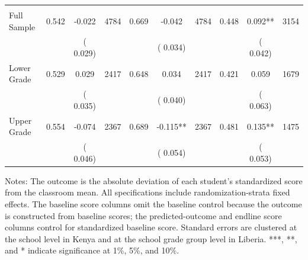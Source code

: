 \begin{table}[H]
\begin{threeparttable}
\begin{tabular}[t]{lccccccccc}
\addlinespace
\multicolumn{10}{l}{\textbf{\textit{Panel B: Liberia}}} \\
Full Sample &  0.542 &  -0.022 & 4784 &  0.669 &  -0.042 & 4784 &  0.448 &   0.092** & 3154 \\
 &  & (  0.029) &  &  & (  0.034) &  &  & (  0.042) & \\
Lower Grade &  0.529 &   0.029 & 2417 &  0.648 &   0.034 & 2417 &  0.421 &   0.059 & 1679 \\
 &  & (  0.035) &  &  & (  0.040) &  &  & (  0.063) & \\
Upper Grade &  0.554 &  -0.074 & 2367 &  0.689 &  -0.115** & 2367 &  0.481 &   0.135** & 1475 \\
 &  & (  0.046) &  &  & (  0.054) &  &  & (  0.053) & \\
\bottomrule
\end{tabular}
\begin{tablenotes}[para]
\item Notes: The outcome is the absolute deviation of each student's standardized score from the classroom mean. All specifications include randomization-strata fixed effects. The baseline score columns omit the baseline control because the outcome is constructed from baseline scores; the predicted-outcome and endline score columns control for standardized baseline score. Standard errors are clustered at the school level in Kenya and at the school grade group level in Liberia. ***, **, and * indicate significance at 1\%, 5\%, and 10\%.
\end{tablenotes}
\end{threeparttable}
\end{table}
